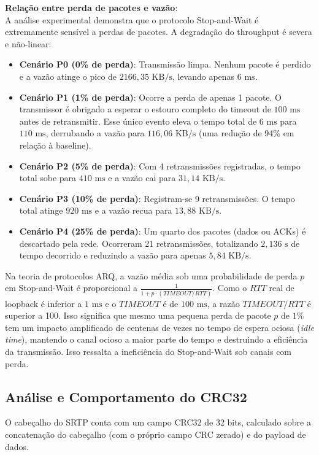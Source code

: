 \documentclass[12pt,a4paper]{article}
\begin{document}
\noindent \textbf{Relação entre perda de pacotes e vazão}:
\\
A análise experimental demonstra que o protocolo Stop-and-Wait é extremamente sensível a perdas de pacotes. A degradação do throughput é severa e não-linear:
\begin{itemize}
    \item \textbf{Cenário P0 (0\% de perda)}: Transmissão limpa. Nenhum pacote é perdido e a vazão atinge o pico de $2166,35\text{ KB/s}$, levando apenas $6\text{ ms}$.
    \item \textbf{Cenário P1 (1\% de perda)}: Ocorre a perda de apenas 1 pacote. O transmissor é obrigado a esperar o estouro completo do timeout de $100\text{ ms}$ antes de retransmitir. Esse único evento eleva o tempo total de $6\text{ ms}$ para $110\text{ ms}$, derrubando a vazão para $116,06\text{ KB/s}$ (uma redução de 94\% em relação à baseline).
    \item \textbf{Cenário P2 (5\% de perda)}: Com 4 retransmissões registradas, o tempo total sobe para $410\text{ ms}$ e a vazão cai para $31,14\text{ KB/s}$.
    \item \textbf{Cenário P3 (10\% de perda)}: Registram-se 9 retransmissões. O tempo total atinge $920\text{ ms}$ e a vazão recua para $13,88\text{ KB/s}$.
    \item \textbf{Cenário P4 (25\% de perda)}: Um quarto dos pacotes (dados ou ACKs) é descartado pela rede. Ocorreram 21 retransmissões, totalizando $2,136\text{ s}$ de tempo decorrido e reduzindo a vazão para apenas $5,84\text{ KB/s}$.
\end{itemize}
Na teoria de protocolos ARQ, a vazão média sob uma probabilidade de perda $p$ em Stop-and-Wait é proporcional a $\frac{1}{1 + p \cdot (TIMEOUT / RTT)}$. Como o $RTT$ real de loopback é inferior a $1\text{ ms}$ e o $TIMEOUT$ é de $100\text{ ms}$, a razão $TIMEOUT/RTT$ é superior a 100. Isso significa que mesmo uma pequena perda de pacote $p$ de $1\%$ tem um impacto amplificado de centenas de vezes no tempo de espera ociosa (\textit{idle time}), mantendo o canal ocioso a maior parte do tempo e destruindo a eficiência da transmissão. Isso ressalta a ineficiência do Stop-and-Wait sob canais com perda.

\subsection{Análise e Comportamento do CRC32}
O cabeçalho do SRTP conta com um campo CRC32 de 32 bits, calculado sobre a concatenação do cabeçalho (com o próprio campo CRC zerado) e do payload de dados.
\end{document}
